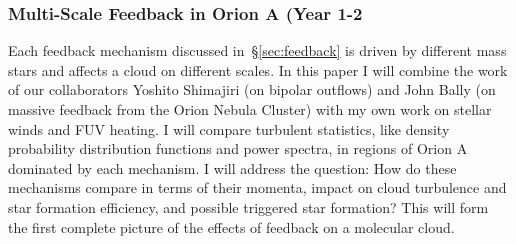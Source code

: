 \subsubsection{Multi-Scale Feedback in Orion A (Year 1-2}\label{sec:paper2}
        Each feedback mechanism discussed in~\S\ref{sec:feedback} is driven by different mass stars and affects a cloud on different scales. In this paper I will combine the work of our collaborators Yoshito Shimajiri (on bipolar outflows) and John Bally (on massive feedback from the Orion Nebula Cluster) with my own work on stellar winds and FUV heating. I will compare turbulent statistics, like density probability distribution functions and power spectra, in regions of Orion A dominated by each mechanism. I will address the question: How do these mechanisms compare in terms of their momenta, impact on cloud turbulence and star formation efficiency, and possible triggered star formation? This will form the first complete picture of the effects of feedback on a molecular cloud.

